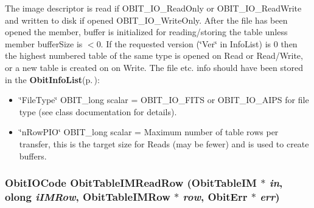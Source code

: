 The image descriptor is read if OBIT\_\-IO\_\-Read\-Only or OBIT\_\-IO\_\-Read\-Write and written to disk if opened OBIT\_\-IO\_\-Write\-Only. After the file has been opened the member, buffer is initialized for reading/storing the table unless member buffer\-Size is $<$0. If the requested version (\char`\"{}Ver\char`\"{} in Info\-List) is 0 then the highest numbered table of the same type is opened on Read or Read/Write, or a new table is created on on Write. The file etc. info should have been stored in the {\bf Obit\-Info\-List}{\rm (p.\,\pageref{structObitInfoList})}: \begin{itemize}
\item \char`\"{}File\-Type\char`\"{} OBIT\_\-long scalar = OBIT\_\-IO\_\-FITS or OBIT\_\-IO\_\-AIPS for file type (see class documentation for details). \item \char`\"{}n\-Row\-PIO\char`\"{} OBIT\_\-long scalar = Maximum number of table rows per transfer, this is the target size for Reads (may be fewer) and is used to create buffers. 
\end{itemize}
\subsubsection{\setlength{\rightskip}{0pt plus 5cm}Obit\-IOCode Obit\-Table\-IMRead\-Row ({\bf Obit\-Table\-IM} $\ast$ {\em in}, {\bf olong} {\em i\-IMRow}, {\bf Obit\-Table\-IMRow} $\ast$ {\em row}, {\bf Obit\-Err} $\ast$ {\em err})}\label{ObitTableIM_8c_a22}


